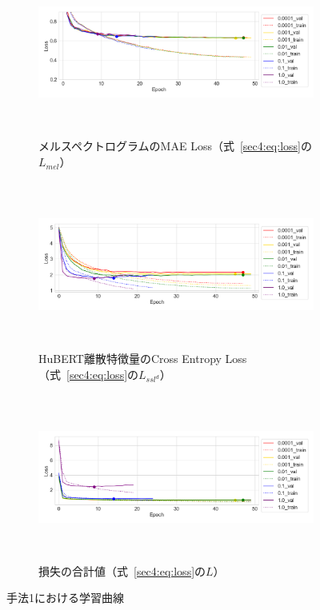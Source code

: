 \documentclass[12pt]{jarticle}
\numberwithin{equation}{section}    %
\numberwithin{figure}{section}      %
\numberwithin{table}{section}      %
\begin{document}
\begin{figure}[bt]
    \centering
    \begin{subfigure}{\linewidth}
        \centering
        \includegraphics[height=55mm]{./figure/sec4/learning_curve/impact_of_loss_weights_across_methods/0/mel_loss.png}
        \caption{メルスペクトログラムのMAE Loss（式~\eqref{sec4:eq:loss}の$L_{mel}$）}
        \label{sec4:fig:learning_curve_method_1_val_mel_loss}
    \end{subfigure}
    \begin{subfigure}{\linewidth}
        \centering
        \includegraphics[height=55mm]{./figure/sec4/learning_curve/impact_of_loss_weights_across_methods/0/ssl_feature_cluster_loss.png}
        \caption{HuBERT離散特徴量のCross Entropy Loss（式~\eqref{sec4:eq:loss}の$L_{ssl^{d}}$）}
        \label{sec4:fig:learning_curve_method_1_val_ssl_feature_cluster_loss}
    \end{subfigure}
    \begin{subfigure}{\linewidth}
        \centering
        \includegraphics[height=55mm]{./figure/sec4/learning_curve/impact_of_loss_weights_across_methods/0/total_loss.png}
        \caption{損失の合計値（式~\eqref{sec4:eq:loss}の$L$）}
        \label{sec4:fig:learning_curve_method_1_val_total_loss}
    \end{subfigure}
    \caption{手法1における学習曲線}
    \label{sec4:fig:learning_curve_method_1_val_losses}
\end{figure}
\end{document}
